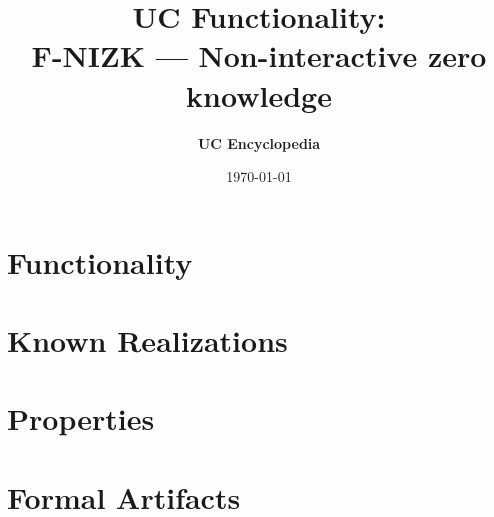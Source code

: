 \documentclass[11pt,a4paper]{article}
\title{\textbf{\Large UC Functionality:}\\[0.2em] \Large F-NIZK --- Non-interactive zero knowledge}
\author{\textbf{UC Encyclopedia}}
\date{\today}
\newtheorem{functionality}{Functionality}
\begin{document}
\maketitle

\begin{abstract}
\end{abstract}

\section{Functionality}

%

\section{Known Realizations}


\section{Properties}


\section{Formal Artifacts}

\end{document}

